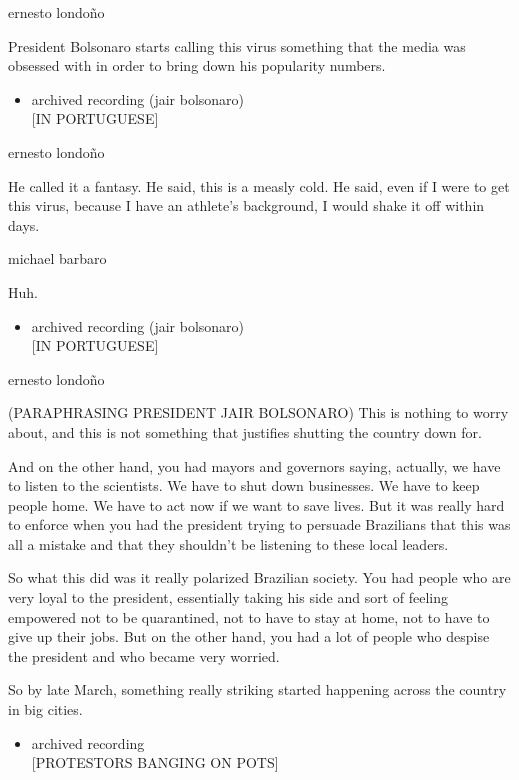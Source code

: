 ernesto londoño

President Bolsonaro starts calling this virus something that the media
was obsessed with in order to bring down his popularity numbers.

\begin{itemize}
\tightlist
\item
  archived recording (jair bolsonaro)\\
  {[}IN PORTUGUESE{]}
\end{itemize}

ernesto londoño

He called it a fantasy. He said, this is a measly cold. He said, even if
I were to get this virus, because I have an athlete's background, I
would shake it off within days.

michael barbaro

Huh.

\begin{itemize}
\tightlist
\item
  archived recording (jair bolsonaro)\\
  {[}IN PORTUGUESE{]}
\end{itemize}

ernesto londoño

(PARAPHRASING PRESIDENT JAIR BOLSONARO) This is nothing to worry about,
and this is not something that justifies shutting the country down for.

And on the other hand, you had mayors and governors saying, actually, we
have to listen to the scientists. We have to shut down businesses. We
have to keep people home. We have to act now if we want to save lives.
But it was really hard to enforce when you had the president trying to
persuade Brazilians that this was all a mistake and that they shouldn't
be listening to these local leaders.

So what this did was it really polarized Brazilian society. You had
people who are very loyal to the president, essentially taking his side
and sort of feeling empowered not to be quarantined, not to have to stay
at home, not to have to give up their jobs. But on the other hand, you
had a lot of people who despise the president and who became very
worried.

So by late March, something really striking started happening across the
country in big cities.

\begin{itemize}
\tightlist
\item
  archived recording\\
  {[}PROTESTORS BANGING ON POTS{]}
\end{itemize}

